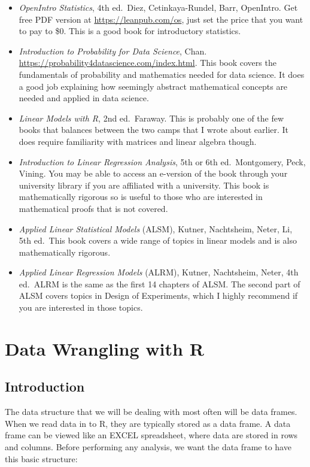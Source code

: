 \documentclass[
]{book}
\begin{document}
\begin{itemize}
\item
  \emph{OpenIntro Statistics}, 4th ed.~Diez, Cetinkaya-Rundel, Barr, OpenIntro. Get free PDF version at \url{https://leanpub.com/os}, just set the price that you want to pay to \$0. This is a good book for introductory statistics.
\item
  \emph{Introduction to Probability for Data Science}, Chan. \url{https://probability4datascience.com/index.html}. This book covers the fundamentals of probability and mathematics needed for data science. It does a good job explaining how seemingly abstract mathematical concepts are needed and applied in data science.
\item
  \emph{Linear Models with R}, 2nd ed.~Faraway. This is probably one of the few books that balances between the two camps that I wrote about earlier. It does require familiarity with matrices and linear algebra though.
\item
  \emph{Introduction to Linear Regression Analysis}, 5th or 6th ed.~Montgomery, Peck, Vining. You may be able to access an e-version of the book through your university library if you are affiliated with a university. This book is mathematically rigorous so is useful to those who are interested in mathematical proofs that is not covered.
\item
  \emph{Applied Linear Statistical Models} (ALSM), Kutner, Nachtsheim, Neter, Li, 5th ed.~This book covers a wide range of topics in linear models and is also mathematically rigorous.
\item
  \emph{Applied Linear Regression Models} (ALRM), Kutner, Nachtsheim, Neter, 4th ed.~ALRM is the same as the first 14 chapters of ALSM. The second part of ALSM covers topics in Design of Experiments, which I highly recommend if you are interested in those topics.
\end{itemize}

\hypertarget{wrangling}{%
\chapter{Data Wrangling with R}\label{wrangling}}

\hypertarget{introduction}{%
\section{Introduction}\label{introduction}}

The data structure that we will be dealing with most often will be data frames. When we read data in to R, they are typically stored as a data frame. A data frame can be viewed like an EXCEL spreadsheet, where data are stored in rows and columns. Before performing any analysis, we want the data frame to have this basic structure:
\end{document}
